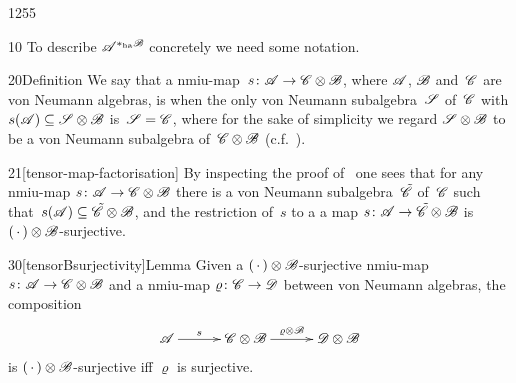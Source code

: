 \begin{parsec}{1255}
\begin{point}{10}
To describe $\mathscr{A}^{*_\mathrm{ha}\mathscr{B}}$ concretely
we need some notation.
\end{point}
\begin{point}{20}{Definition}
We say that a nmiu-map~$s\colon \mathscr{A}\to\mathscr{C}\otimes \mathscr{B}$,
where $\mathscr{A}$, $\mathscr{B}$ and~$\mathscr{C}$
are von Neumann algebras,
is %
when the only von Neumann subalgebra~$\mathscr{S}$
of~$\mathscr{C}$ with $s(\mathscr{A})\subseteq \mathscr{S}\otimes\mathscr{B}$
is~$\mathscr{S}=\mathscr{C}$,
where for the sake of simplicity we regard $\mathscr{S}\otimes \mathscr{B}$
to be a von Neumann subalgebra of~$\mathscr{C}\otimes \mathscr{B}$
(c.f.~).
\begin{point}{21}[tensor-map-factorisation]
    By inspecting the proof of~
one sees that for any nmiu-map $s\colon \mathscr{A}\to\mathscr{C}\otimes \mathscr{B}$
there is a von Neumann subalgebra~$\tilde{\mathscr{C}}$
of~$\mathscr{C}$
such that~$s(\mathscr{A})\subseteq \tilde{\mathscr{C}}\otimes \mathscr{B}$,
and the restriction of~$s$
to a a map $s\colon \mathscr{A}\to\tilde{\mathscr{C}}\otimes \mathscr{B}$
    is $(\,\cdot\,)\otimes\mathscr{B}$-surjective.
\end{point}
\end{point}
\begin{point}{30}[tensorBsurjectivity]{Lemma}
Given a $(\,\cdot\,)\otimes \mathscr{B}$-surjective
nmiu-map $s\colon \mathscr{A}\to\mathscr{C}\otimes \mathscr{B}$
and a nmiu-map  $\varrho\colon \mathscr{C}\to\mathscr{D}$
between von Neumann algebras,
the composition 
\begin{equation*}
\xymatrix@C=3em{
\scrA
\ar[r]^-s
    &
\scrC\otimes\scrB
    \ar[r]^-{\varrho\otimes\scrB}
    &
    \scrD\otimes\scrB
}
\end{equation*}
is $(\,\cdot\,)\otimes\mathscr{B}$-surjective
iff $\varrho$ is surjective.
\end{point}
\end{parsec}
